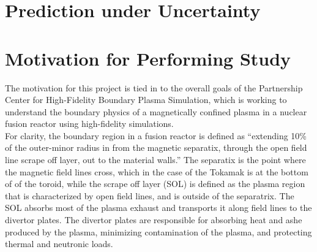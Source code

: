 \documentclass{article}
\begin{document}

\section{Prediction under Uncertainty}



\section{Motivation for Performing Study}

The motivation for this project is tied in to the overall goals of the Partnership Center for High-Fidelity Boundary Plasma Simulation, which is working to understand the boundary physics of a magnetically confined plasma in a nuclear fusion reactor using high-fidelity simulations. \cite{PPPL_P:2}\\

For clarity, the boundary region in a fusion reactor is defined as “extending 10\% of the outer-minor radius in from the magnetic separatix, through the open field line scrape off layer, out to the material walls.” The separatix is the point where the magnetic field lines cross, which in the case of the Tokamak is at the bottom of of the toroid, while the scrape off layer (SOL) is defined as the plasma region that is characterized by open field lines, and is outside of the separatrix. The SOL absorbs most of the plasma exhaust and transports it along field lines to the divertor plates. The divertor plates are responsible for absorbing heat and ashe produced by the plasma, minimizing contamination of the plasma, and protecting thermal and neutronic loads.\\
\end{document}
